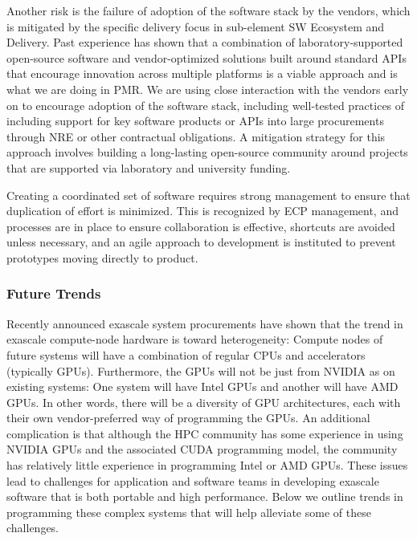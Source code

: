 Another risk is the failure of adoption of the software stack by the vendors, which is mitigated by the specific delivery focus in sub-element SW Ecosystem and Delivery. Past experience has shown that a combination of laboratory-supported open-source software and vendor-optimized solutions built around standard APIs that encourage innovation across multiple platforms is a viable approach and is what we are doing in PMR. We are using close interaction with the vendors early on to encourage adoption of the software stack, including well-tested practices of including support for key software products or APIs into large procurements through NRE or other contractual obligations. A mitigation strategy for this approach involves building a long-lasting open-source community around projects that are supported via laboratory and university funding. 

Creating a coordinated set of software requires strong management to ensure that duplication of effort is minimized. This is recognized by ECP management, and processes are in place to ensure collaboration is effective, shortcuts are avoided unless necessary, and an agile approach to development is instituted to prevent prototypes moving directly to product. 

\subsubsection{Future Trends}
Recently announced exascale system procurements have shown that the
trend in exascale compute-node hardware is toward heterogeneity:
Compute nodes of future systems will have a combination of regular
CPUs and accelerators (typically GPUs). Furthermore, the GPUs will not
be just from NVIDIA as on existing systems: One system will have Intel
GPUs and another will have AMD GPUs. In other words, there will be a
diversity of GPU architectures, each with their own vendor-preferred
way of programming the GPUs. An additional complication
is that although the HPC community has some experience in using NVIDIA
GPUs and the associated CUDA programming model, the community has relatively
little experience in programming Intel or AMD GPUs.  These
issues lead to challenges for application and software teams in
developing exascale software that is both portable and high performance. Below
we outline trends in programming these complex systems that will help
alleviate some of these challenges.


